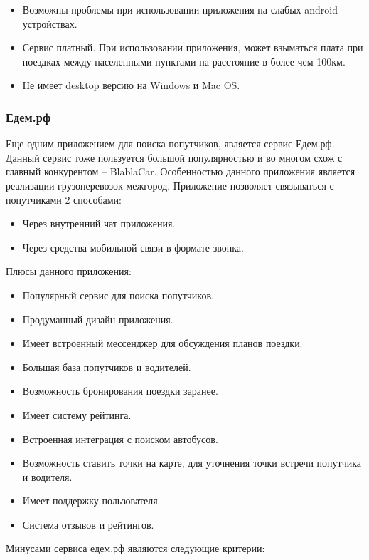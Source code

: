 \begin{itemize}
\item Возможны проблемы при использовании приложения на слабых android устройствах.
\item Сервис платный. При использовании приложения, может взыматься плата при поездках между населенными пунктами на расстояние в более чем 100км.
\item Не имеет desktop версию на Windows и Mac OS.
\end{itemize}

\subsubsection{Едем.рф}
Еще одним приложением для поиска попутчиков, является сервис Едем.рф. Данный сервис тоже пользуется большой популярностью и во многом схож с главный конкурентом – BlablaCar. Особенностью данного приложения является реализации грузоперевозок межгород.
Приложение позволяет связываться с попутчиками 2 способами:

\begin{itemize}
\item Через внутренний чат приложения.
\item Через средства мобильной связи в формате звонка.
\end{itemize}

Плюсы данного приложения:

\begin{itemize}
\item Популярный сервис для поиска попутчиков.
\item Продуманный дизайн приложения.
\item Имеет встроенный мессенджер для обсуждения планов поездки.
\item Большая база попутчиков и водителей.
\item Возможность бронирования поездки заранее.
\item Имеет систему рейтинга.
\item Встроенная интеграция с поиском автобусов.
\item Возможность ставить точки на карте, для уточнения точки встречи попутчика и водителя.
\item Имеет поддержку пользователя.
\item Система отзывов и рейтингов.
\end{itemize}

Минусами сервиса едем.рф являются следующие критерии:

